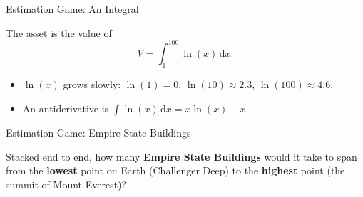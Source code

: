 \begin{frame}{Estimation Game: An Integral}
  \begin{sqt:definition}
    The asset is the value of
    $$V = \int_{1}^{100} \ln(x)\,\mathrm{d}x.$$
  \end{sqt:definition}

  \begin{itemize}
    \item<2-> $\ln(x)$ grows slowly: $\ln(1) = 0$, $\ln(10) \approx 2.3$, $\ln(100) \approx 4.6$.
    \item<3-> An antiderivative is $\int \ln(x)\,\mathrm{d}x = x\ln(x) - x$.
  \end{itemize}

\end{frame}

\begin{frame}{Estimation Game: Empire State Buildings}
  \begin{sqt:definition}
    Stacked end to end, how many \textbf{Empire State Buildings} would it take
    to span from the \textbf{lowest} point on Earth (Challenger Deep) to the
    \textbf{highest} point (the summit of Mount Everest)?
  \end{sqt:definition}

\end{frame}

